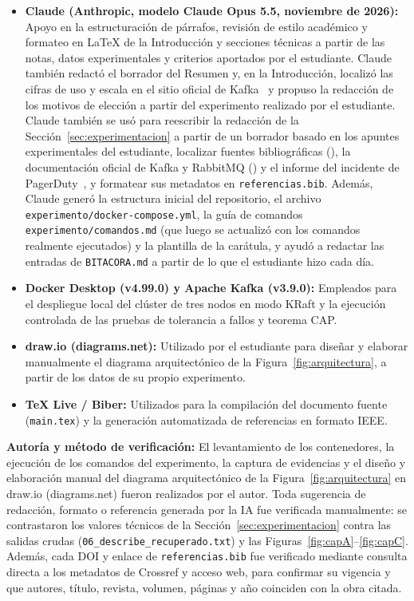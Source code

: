 \documentclass[12pt,a4paper]{article}
\begin{document}
\begin{itemize}
  \item \textbf{Claude (Anthropic, modelo Claude Opus 5.5, noviembre de 2026):} Apoyo en la estructuración de párrafos, revisión de estilo académico y formateo en LaTeX de la Introducción y secciones técnicas a partir de las notas, datos experimentales y criterios aportados por el estudiante. Claude también redactó el borrador del Resumen y, en la Introducción, localizó las cifras de uso y escala en el sitio oficial de Kafka~\cite{KafkaHome} y propuso la redacción de los motivos de elección a partir del experimento realizado por el estudiante. Claude también se usó para reescribir la redacción de la Sección~\ref{sec:experimentacion} a partir de un borrador basado en los apuntes experimentales del estudiante, localizar fuentes bibliográficas (\cite{Raptis2023,Raptis2024,Maharjan2023,Kaczor2022,Wang2022KRaft}), la documentación oficial de Kafka y RabbitMQ (\cite{KafkaDesign39,RabbitMQ2021Deprecation,RabbitMQQuorum}) y el informe del incidente de PagerDuty~\cite{PagerDuty2025}, y formatear sus metadatos en \texttt{referencias.bib}. Además, Claude generó la estructura inicial del repositorio, el archivo \texttt{experimento/docker-compose.yml}, la guía de comandos \texttt{experimento/comandos.md} (que luego se actualizó con los comandos realmente ejecutados) y la plantilla de la carátula, y ayudó a redactar las entradas de \texttt{BITACORA.md} a partir de lo que el estudiante hizo cada día.
  \item \textbf{Docker Desktop (v4.99.0) y Apache Kafka (v3.9.0):} Empleados para el despliegue local del clúster de tres nodos en modo KRaft y la ejecución controlada de las pruebas de tolerancia a fallos y teorema CAP.
  \item \textbf{draw.io (diagrams.net):} Utilizado por el estudiante para diseñar y elaborar manualmente el diagrama arquitectónico de la Figura~\ref{fig:arquitectura}, a partir de los datos de su propio experimento.
  \item \textbf{TeX Live / Biber:} Utilizados para la compilación del documento fuente (\texttt{main.tex}) y la generación automatizada de referencias en formato IEEE.
\end{itemize}

\textbf{Autoría y método de verificación:} El levantamiento de los contenedores, la ejecución de los comandos del experimento, la captura de evidencias y el diseño y elaboración manual del diagrama arquitectónico de la Figura~\ref{fig:arquitectura} en draw.io (diagrams.net) fueron realizados por el autor. Toda sugerencia de redacción, formato o referencia generada por la IA fue verificada manualmente: se contrastaron los valores técnicos de la Sección~\ref{sec:experimentacion} contra las salidas crudas (\texttt{06\_describe\_recuperado.txt}) y las Figuras~\ref{fig:capA}--\ref{fig:capC}. Además, cada DOI y enlace de \texttt{referencias.bib} fue verificado mediante consulta directa a los metadatos de Crossref y acceso web, para confirmar su vigencia y que autores, título, revista, volumen, páginas y año coinciden con la obra citada.
\end{document}
